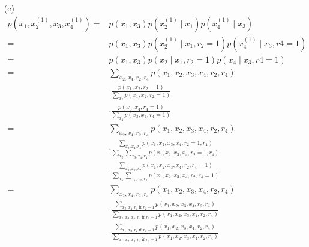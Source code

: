\documentclass[11pt]{article}
\begin{document}
\begin{answertext}{22cm}{}
\begin{enumerate}
\item[(c)]
\begin{align*}
p(x_1, x_2^{(1)}, x_3, x_4^{(1)}) =& p(x_1, x_3)p(x_2^{(1)} \mid x_1)p(x_4^{(1)} \mid x_3)\\
=& p(x_1,x_3)p(x_2^{(1)} \mid x_1, r_2=1)p(x_4^{(1)} \mid x_3, r4=1)\\
=& p(x_1,x_3)p(x_2 \mid x_1, r_2=1)p(x_4 \mid x_3, r4=1)\\
=& \sum_{x_2,x_4,r_2,r_4}p(x_1, x_2, x_3, x_4, r_2, r_4)\\
& \cdot \frac{p(x_1, x_2, r_2=1)}{\sum_{x_2}p(x_1, x_2, r_2=1)}\\
& \cdot \frac{p(x_3, x_4, r_4=1)}{\sum_{x_4}p(x_3, x_4, r_4=1)}\\
=& \sum_{x_2,x_4,r_2,r_4}p(x_1, x_2, x_3, x_4, r_2, r_4)\\
& \cdot \frac{\sum_{x_3,x_4,r_4}p(x_1, x_2, x_3, x_4, r_2=1, r_4)}{\sum_{x_2}\sum_{x_3,x_4,r_4}p(x_1, x_2, x_3, x_4, r_2=1, r_4)}\\
& \cdot \frac{\sum_{x_1,x_2,r_2}p(x_1, x_2, x_3, x_4, r_2, r_4=1)}{\sum_{x_4}\sum_{x_1,x_2,r_2}p(x_1, x_2, x_3, x_4, r_2, r_4=1)}\\
=& \sum_{x_2,x_4,r_2,r_4}p(x_1, x_2, x_3, x_4, r_2, r_4)\\
& \cdot \frac{\sum_{x_3,x_4,r_4\text{ if }r_2=1}p(x_1, x_2, x_3, x_4, r_2, r_4)}{\sum_{x_2, x_3,x_4,r_4\text{ if }r_2=1}p(x_1, x_2, x_3, x_4, r_2, r_4)}\\
& \cdot \frac{\sum_{x_1,x_2,r_2\text{ if }r_4=1}p(x_1, x_2, x_3, x_4, r_2, r_4)}{\sum_{x_1,x_2,x_4,r_2\text{ if }r_4=1}p(x_1, x_2, x_3, x_4, r_2, r_4)}\\
\end{align*}

\end{enumerate}
\end{answertext} 
\end{document}
